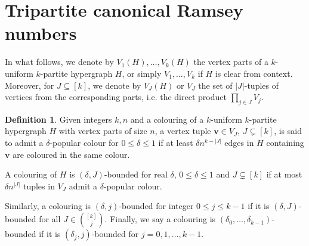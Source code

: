 \documentclass[10pt,a4paper]{article}
\theoremstyle{plain}
\theoremstyle{definition}
\newtheorem{definition}{Definition}
\begin{document}
\section{Tripartite canonical Ramsey numbers}\label{sec-tri-erado}

In what follows, we denote by $V_1(H),\dots,V_k(H)$ the vertex parts of a $k$-uniform $k$-partite hypergraph $H$, or simply $V_1,\dots,V_k$ if $H$ is clear from context. Moreover, for $J\subseteq[k]$, we denote by $V_J(H)$ or $V_J$ the set of $|J|$-tuples of vertices from the corresponding parts, i.e. the direct product $\prod_{j\in J} V_j$.

\begin{definition}\label{def-bounded}
    Given integers $k,n$ and a colouring of a $k$-uniform $k$-partite hypergraph $H$ with vertex parts of size $n$, a vertex tuple $\mathbf{v}\in V_J$, $J\subsetneq [k]$, is said to admit a $\delta$-popular colour for $0\le \delta\le 1$ if at least $\delta n^{k-|J|}$ edges in $H$ containing $\mathbf{v}$ are coloured in the same colour.
    
    A colouring of $H$ is $(\delta,J)$-bounded for real $\delta$, $0\le \delta\le 1$ and $J\subsetneq[k]$ if at most $\delta n^{|J|}$ tuples in $V_J$ admit a $\delta$-popular colour.
    
    Similarly, a colouring is $(\delta,j)$-bounded for integer $0\le j\le k-1$ if it is $(\delta,J)$-bounded for all $J\in\binom{[k]}{j}$. Finally, we say a colouring is $(\delta_0,\dots,\delta_{k-1})$-bounded if it is $(\delta_j,j)$-bounded for $j=0,1,\dots,k-1$.
\end{definition}
\end{document}
